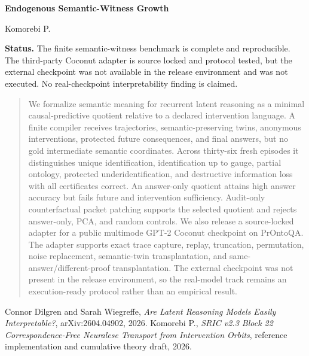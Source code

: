 \documentclass[11pt,letterpaper]{article}
\theoremstyle{kmplain}\newtheorem{theorem}{Theorem}[section]\newtheorem{proposition}[theorem]{Proposition}\newtheorem{conditionaltheorem}[theorem]{Conditional Theorem}
\theoremstyle{kmdef}\newtheorem{definition}[theorem]{Definition}
\theoremstyle{kmremark}\newtheorem{warning}[theorem]{Warning}\newtheorem{remark}[theorem]{Remark}
\begin{document}
\hypersetup{pageanchor=false}
\begin{titlepage}
\centering\vspace*{1.0in}
{\Huge\bfseries\color{KMBlue} Endogenous Semantic-Witness Growth\par}
\vspace{0.15in}{\Large and an External Latent-Reasoner Pilot Contract\par}
\vspace{0.45in}{\large SRIC Block 23\par}
\vfill{\Large Komorebi P.\par}\vspace{0.12in}{\large Version 2.4, September 2026\par}
\vfill
\begin{minipage}{0.86\textwidth}\small
\textbf{Status.} The finite semantic-witness benchmark is complete and reproducible. The third-party Coconut adapter is source locked and protocol tested, but the external checkpoint was not available in the release environment and was not executed. No real-checkpoint interpretability finding is claimed.
\end{minipage}
\end{titlepage}
\hypersetup{pageanchor=true}
\begin{abstract}
We formalize semantic meaning for recurrent latent reasoning as a minimal causal-predictive quotient relative to a declared intervention language. A finite compiler receives trajectories, semantic-preserving twins, anonymous interventions, protected future consequences, and final answers, but no gold intermediate semantic coordinates. Across thirty-six fresh episodes it distinguishes unique identification, identification up to gauge, partial ontology, protected underidentification, and destructive information loss with all certificates correct. An answer-only quotient attains high answer accuracy but fails future and intervention sufficiency. Audit-only counterfactual packet patching supports the selected quotient and rejects answer-only, PCA, and random controls. We also release a source-locked adapter for a public multimode GPT-2 Coconut checkpoint on PrOntoQA. The adapter supports exact trace capture, replay, truncation, permutation, noise replacement, semantic-twin transplantation, and same-answer/different-proof transplantation. The external checkpoint was not present in the release environment, so the real-model track remains an execution-ready protocol rather than an empirical result.
\end{abstract}
\tableofcontents\clearpage
{}

\begin{thebibliography}{9}\footnotesize
{}
Connor Dilgren and Sarah Wiegreffe,
\emph{Are Latent Reasoning Models Easily Interpretable?},
arXiv:2604.04902, 2026.
Komorebi P.,
\emph{SRIC v2.3 Block 22 Correspondence-Free Neuralese Transport from Intervention Orbits},
reference implementation and cumulative theory draft, 2026.
\end{thebibliography}
\end{document}
